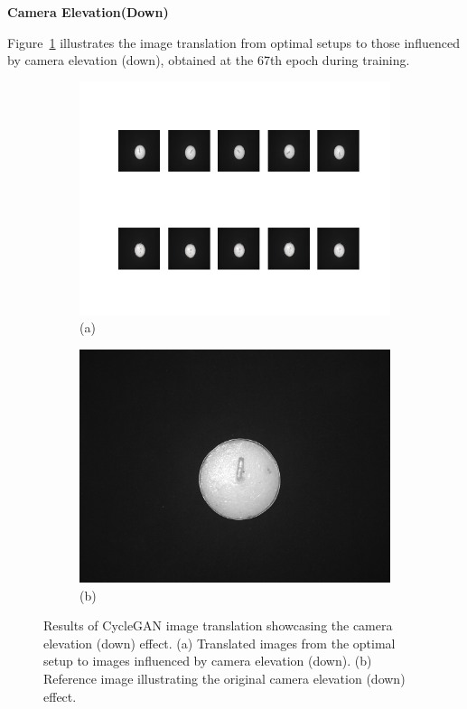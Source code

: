 \documentclass[12pt,DIV14,BCOR12mm,a4paper,footinclude=false,headinclude,parskip=half-,twoside,openright,cleardoublepage=empty,toc=index,bibliography=totoc,listof=totoc]{scrreprt}
\numberwithin{equation}{chapter}
\begin{document}
\textbf{Camera Elevation(Down)}

Figure~\ref{fig:camera_elevation_down_result} illustrates the image translation from optimal setups to those influenced by camera elevation (down), obtained at the 67th epoch during training. 

\begin{figure}
    \centering
    \begin{subfigure}[b]{0.85\textwidth}
        \centering
        \includegraphics[width=\textwidth]{../media/candles_bright.png}
        \caption*{(a)}
    \end{subfigure}
    \hfill
    \begin{subfigure}[b]{0.25\textwidth}
        \centering
        \includegraphics[width=\textwidth]{../media/candles_bright_real.png}
        \caption*{(b)}
    \end{subfigure}
    \caption{Results of CycleGAN image translation showcasing the camera elevation (down) effect. (a) Translated images from the optimal setup to images influenced by camera elevation (down). (b) Reference image illustrating the original camera elevation (down) effect.}
    \label{fig:camera_elevation_down_result}
\end{figure}
\end{document}
